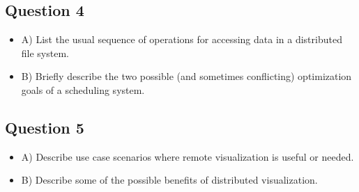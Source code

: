 \documentclass[oneside]{article}
\begin{document}
\newpage

\subsection*{Question 4}

\begin{itemize}

\item A) List the usual sequence of operations
for accessing data in a distributed file system.

\vskip 8cm

\item B) Briefly describe the two possible (and sometimes conflicting) 
optimization goals of a scheduling system.

\end{itemize}

\newpage


\subsection*{Question 5}

\begin{itemize}

\item A) Describe use case scenarios where remote visualization
is useful or needed.

\vskip 8cm

\item B) Describe some of the possible benefits of distributed 
visualization.

\end{itemize}
\end{document}

